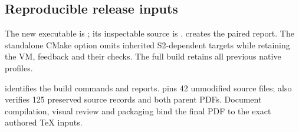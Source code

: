 \subsection{Reproducible release inputs}
The new executable is ; its inspectable source is
.  creates the paired
report. The standalone CMake option  omits
inherited S2-dependent targets while retaining the VM, feedback and their
checks. The full build retains all previous native profiles.

 identifies the build commands and reports.
 pins 42 unmodified source files;
 also verifies 125 preserved source records
and both parent PDFs. Document compilation, visual review and packaging
bind the final PDF to the exact authored TeX inputs.
\clearpage
